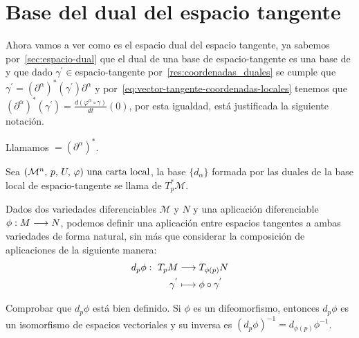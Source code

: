 \section{Base del dual del espacio tangente}\label{sec:base-dual-espacio-tangente}

Ahora vamos a ver como es el espacio dual del espacio tangente, ya sabemos por~\ref{sec:espacio-dual} que el dual de
una base de \gls{espacio-tangente} es una base de  y que dado $\gamma^{'}\in$\gls{espacio-tangente} por~\ref{res:coordenadas_duales} se cumple que $\gamma^{'} = (\partial^\alpha)^*(\gamma^{'})
\partial^\alpha$ y por~\ref{eq:vector-tangente-coordenadas-locales} tenemos que $(\partial^\alpha)^*(\gamma^{'})=\frac{d
(\varphi^\alpha\circ\gamma)}{dt}(0)$, por esta igualdad, está justificada la siguiente notación.

\begin{notation}
  Llamamos $= (\partial^\alpha)^*$.
\end{notation}

\begin{definition}
  Sea $(\mathcal{M}^n,\thinspace p,\thinspace U,\thinspace \varphi)\textmd{ una carta local}$, la base $\{d_\alpha\}$ formada por las duales de la base local de \gls{espacio-tangente} se llama
   de $T^*_p\mathcal{M}$.
\end{definition}

Dados dos variedades diferenciables $\mathcal{M}$ y $N$ y una aplicación diferenciable $\phi:M\longrightarrow N$,
podemos definir una aplicación entre espacios tangentes a ambas variedades de forma natural, sin
más que considerar la composición de aplicaciones de la siguiente manera:
\begin{equation}
  \label{eq:diferencial-aplicacion}
  \begin{alignedat}{1}
    d_p\phi:\ T_pM & \longrightarrow T_{\phi(p)}N \\ \gamma^{'} & \longmapsto \phi\circ\gamma^{'}
  \end{alignedat}
\end{equation}

\begin{exercise}
  Comprobar que $d_p\phi$ está bien definido.
  Si $\phi$ es un difeomorfismo, entonces $d_p\phi$ es
  un isomorfismo de espacios vectoriales y su inversa es $(d_p\phi)^{-1}=d_{\phi(p)}\phi^{-1}$.
\end{exercise}
